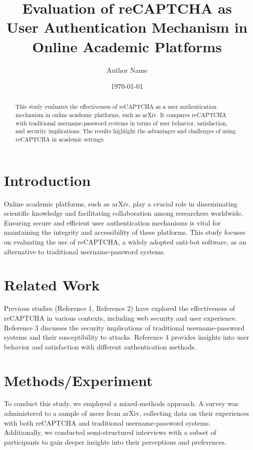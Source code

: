 \documentclass{article}
\title{Evaluation of reCAPTCHA as User Authentication Mechanism in Online Academic Platforms}
\author{Author Name}
\date{\today}
\begin{document}
\maketitle

\begin{abstract}
This study evaluates the effectiveness of reCAPTCHA as a user authentication mechanism in online academic platforms, such as arXiv. It compares reCAPTCHA with traditional username-password systems in terms of user behavior, satisfaction, and security implications. The results highlight the advantages and challenges of using reCAPTCHA in academic settings.
\end{abstract}

\section{Introduction}
Online academic platforms, such as arXiv, play a crucial role in disseminating scientific knowledge and facilitating collaboration among researchers worldwide. Ensuring secure and efficient user authentication mechanisms is vital for maintaining the integrity and accessibility of these platforms. This study focuses on evaluating the use of reCAPTCHA, a widely adopted anti-bot software, as an alternative to traditional username-password systems. 

\section{Related Work}
Previous studies (Reference 1, Reference 2) have explored the effectiveness of reCAPTCHA in various contexts, including web security and user experience. Reference 3 discusses the security implications of traditional username-password systems and their susceptibility to attacks. Reference 4 provides insights into user behavior and satisfaction with different authentication methods.

\section{Methods/Experiment}
To conduct this study, we employed a mixed-methods approach. A survey was administered to a sample of users from arXiv, collecting data on their experiences with both reCAPTCHA and traditional username-password systems. Additionally, we conducted semi-structured interviews with a subset of participants to gain deeper insights into their perceptions and preferences.
\end{document}
